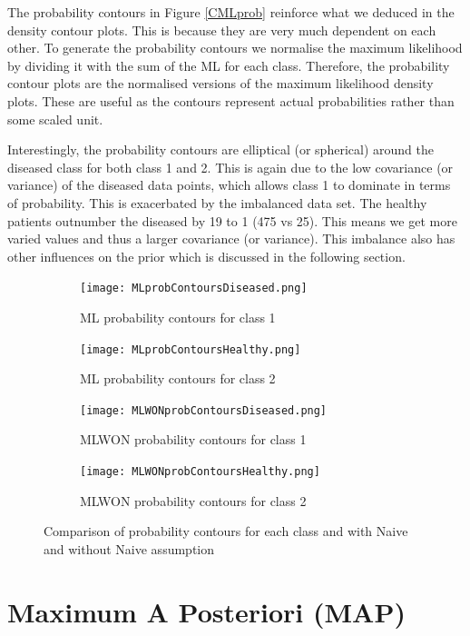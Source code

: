 {The probability contours in Figure \ref{CMLprob} reinforce what we deduced in the density contour plots. This is because they are very much dependent on each other. To generate the probability contours we normalise the maximum likelihood by dividing it with the sum of the ML for each class. Therefore, the probability contour plots are the normalised versions of the maximum likelihood density plots. These are useful as the contours represent actual probabilities rather than some scaled unit.

Interestingly, the probability contours are elliptical (or spherical) around the diseased class for both class 1 and 2. This is again due to the low covariance (or variance) of the diseased data points, which allows class 1 to dominate in terms of probability. This is exacerbated by the imbalanced data set. The healthy patients outnumber the diseased by 19 to 1 (475 vs 25). This means we get more varied values and thus a larger covariance (or variance). This imbalance also has other influences on the prior which is discussed in the following section.

\begin{figure}[h!] 
	\centering
	\begin{subfigure}[b]{.40\textwidth}
		\texttt{[image: MLprobContoursDiseased.png]}
		\caption{ML probability contours for class 1}
		\label{fig:model0}
	\end{subfigure}
	\begin{subfigure}[b]{0.40\textwidth}
		\texttt{[image: MLprobContoursHealthy.png]}
		\caption{ML probability contours for class 2}
		\label{fig:model1}
	\end{subfigure}
	\begin{subfigure}[b]{.40\textwidth}
		\texttt{[image: MLWONprobContoursDiseased.png]}
		\caption{MLWON probability contours for class 1}
		\label{fig:model2}
	\end{subfigure}
	\begin{subfigure}[b]{.40\textwidth}
		\texttt{[image: MLWONprobContoursHealthy.png]}
		\caption{MLWON probability contours for class 2}
		\label{fig:model3}
	\end{subfigure}
	\caption{Comparison of probability contours for each class and with Naive and without Naive assumption}
	\label{fig:CMLprob}
\end{figure}

\newpage
\section{Maximum A Posteriori (MAP)}{\label{s1}
	
}}
